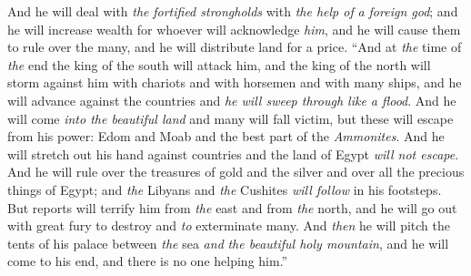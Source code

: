 \begin{biblechapter}
\verse And he will deal with \textit{the} \textit{fortified strongholds} with \textit{the help of} \textit{a foreign god}; and he will increase wealth for whoever will acknowledge \textit{him}, and he will cause them to rule over the many, and he will distribute land for a price.
\verse “And at \textit{the} time of \textit{the} end the king of the south will attack him, and the king of the north will storm against him with chariots and with horsemen and with many ships, and he will advance against the countries and \textit{he will sweep through like a flood}.
\verse And he will come \textit{into the beautiful land} and many will fall victim, but these will escape from his power: Edom and Moab and the best part of the \textit{Ammonites}.
\verse And he will stretch out his hand against countries and the land of Egypt \textit{will not escape}.
\verse And he will rule over the treasures of gold and the silver and over all the precious things of Egypt; and \textit{the} Libyans and \textit{the} Cushites \textit{will follow} in his footsteps.
\verse But reports will terrify him from \textit{the} east and from \textit{the} north, and he will go out with great fury to destroy and \textit{to} exterminate many.
\verse And \textit{then} he will pitch the tents of his palace between \textit{the} sea \textit{and} \textit{the beautiful holy mountain}, and he will come to his end, and there is no one helping him.”
\end{biblechapter}

